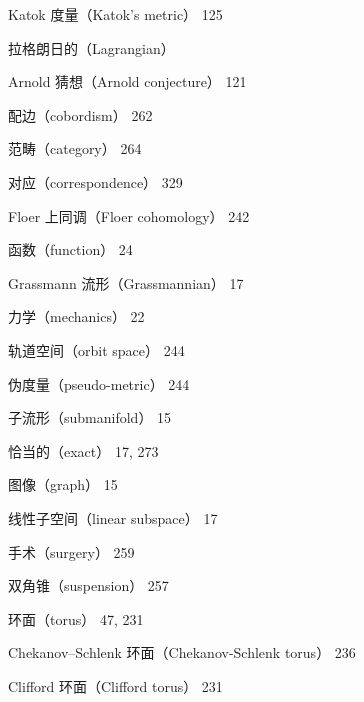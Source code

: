 {\noindent Katok 度量（Katok's metric） 125\par
\noindent 拉格朗日的（Lagrangian）\par
\noindent\hspace*{1.5em}Arnold 猜想（Arnold conjecture） 121\par
\noindent\hspace*{1.5em}配边（cobordism） 262\par
\noindent\hspace*{3em}范畴（category） 264\par
\noindent\hspace*{1.5em}对应（correspondence） 329\par
\noindent\hspace*{1.5em}Floer 上同调（Floer cohomology） 242\par
\noindent\hspace*{1.5em}函数（function） 24\par
\noindent\hspace*{1.5em}Grassmann 流形（Grassmannian） 17\par
\noindent\hspace*{1.5em}力学（mechanics） 22\par
\noindent\hspace*{1.5em}轨道空间（orbit space） 244\par
\noindent\hspace*{3em}伪度量（pseudo-metric） 244\par
\noindent\hspace*{1.5em}子流形（submanifold） 15\par
\noindent\hspace*{3em}恰当的（exact） 17, 273\par
\noindent\hspace*{3em}图像（graph） 15\par
\noindent\hspace*{3em}线性子空间（linear subspace） 17\par
\noindent\hspace*{3em}手术（surgery） 259\par
\noindent\hspace*{3em}双角锥（suspension） 257\par
\noindent\hspace*{3em}环面（torus） 47, 231\par
\noindent\hspace*{4.5em}Chekanov–Schlenk 环面（Chekanov-Schlenk torus） 236\par
\noindent\hspace*{4.5em}Clifford 环面（Clifford torus） 231\par
}
